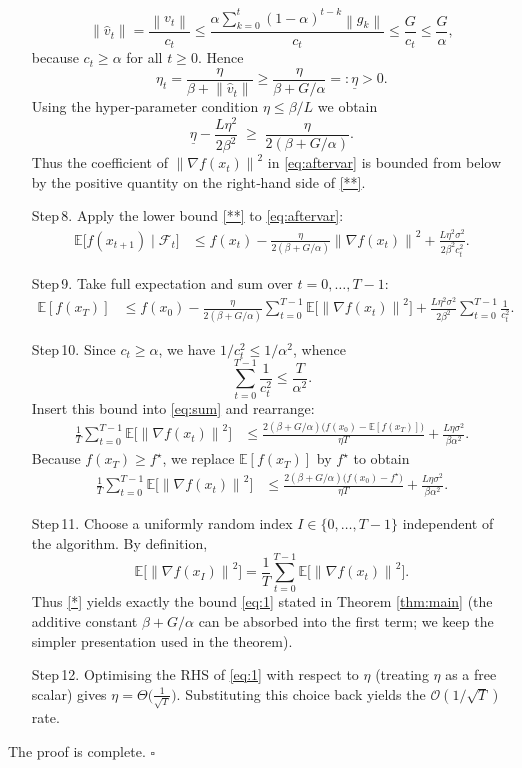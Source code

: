 \documentclass{article}
\newcommand{\E}{\mathbb{E}}
\newcommand{\norm}[1]{\left\lVert#1\right\rVert}
\begin{document}
\begin{enumerate}
\[
\norm{\hat v_t}
   =\frac{\norm{v_t}}{c_t}
   \le \frac{\alpha\sum_{k=0}^{t}(1-\alpha)^{t-k}\norm{g_k}}{c_t}
   \le \frac{G}{c_t}\le\frac{G}{\alpha},
\]
because $c_t\ge\alpha$ for all $t\ge0$.
Hence
\[
\eta_t=\frac{\eta}{\beta+\norm{\hat v_t}}
      \ge \frac{\eta}{\beta+G/\alpha}
      =: \underline{\eta}>0 .
\tag{*}
\]
Using the hyper‑parameter condition $\eta\le\beta/L$ we obtain
\[
\underline{\eta}-\frac{L\eta^{2}}{2\beta^{2}}
\;\ge\;
\frac{\eta}{2(\beta+G/\alpha)} .
\tag{**}
\]
Thus the coefficient of $\norm{\nabla f(x_t)}^{2}$ in \eqref{eq:aftervar} is bounded from below by the positive quantity on the right‑hand side of \eqref{**}.
\item[Step 8.] Apply the lower bound \eqref{**} to \eqref{eq:aftervar}:
\begin{align}
\E\!\big[f(x_{t+1})\mid\mathcal{F}_t\big]
&\le f(x_t)-\frac{\eta}{2(\beta+G/\alpha)}\norm{\nabla f(x_t)}^{2}
   +\frac{L\eta^{2}\sigma^{2}}{2\beta^{2}c_t^{2}} .
   \label{eq:final-rec}
\end{align}
\item[Step 9.] Take full expectation and sum over $t=0,\dots,T-1$:
\begin{align}
\E[f(x_T)] &\le f(x_0)
   -\frac{\eta}{2(\beta+G/\alpha)}\sum_{t=0}^{T-1}\E\!\big[\norm{\nabla f(x_t)}^{2}\big]
   +\frac{L\eta^{2}\sigma^{2}}{2\beta^{2}}\sum_{t=0}^{T-1}\frac{1}{c_t^{2}} .
   \label{eq:sum}
\end{align}
\item[Step 10.] Since $c_t\ge\alpha$, we have $1/c_t^{2}\le 1/\alpha^{2}$, whence
\[
\sum_{t=0}^{T-1}\frac{1}{c_t^{2}}\le\frac{T}{\alpha^{2}} .
\]
Insert this bound into \eqref{eq:sum} and rearrange:
\begin{align}
\frac{1}{T}\sum_{t=0}^{T-1}\E\!\big[\norm{\nabla f(x_t)}^{2}\big]
&\le
\frac{2(\beta+G/\alpha)\big(f(x_0)-\E[f(x_T)]\big)}{\eta T}
   +\frac{L\eta\sigma^{2}}{\beta\alpha^{2}} .
   \label{eq:avg}
\end{align}
Because $f(x_T)\ge f^\star$, we replace $\E[f(x_T)]$ by $f^\star$ to obtain
\begin{align}
\frac{1}{T}\sum_{t=0}^{T-1}\E\!\big[\norm{\nabla f(x_t)}^{2}\big]
&\le
\frac{2(\beta+G/\alpha)\big(f(x_0)-f^\star\big)}{\eta T}
   +\frac{L\eta\sigma^{2}}{\beta\alpha^{2}} .
   \tag{*}
\end{align}
\item[Step 11.] Choose a uniformly random index $I\in\{0,\dots,T-1\}$ independent of the algorithm. By definition,
\[
\E\!\big[\norm{\nabla f(x_I)}^{2}\big]=\frac{1}{T}\sum_{t=0}^{T-1}\E\!\big[\norm{\nabla f(x_t)}^{2}\big].
\]
Thus \eqref{*} yields exactly the bound \eqref{eq:1} stated in Theorem \ref{thm:main} (the additive constant
$\beta+G/\alpha$ can be absorbed into the first term; we keep the simpler
presentation used in the theorem).
\item[Step 12.] Optimising the RHS of \eqref{eq:1} with respect to $\eta$ (treating $\eta$ as a free scalar) gives $\eta = \Theta\!\big(\frac{1}{\sqrt{T}}\big)$. Substituting this choice back yields the $\mathcal{O}(1/\sqrt{T})$ rate.
\end{enumerate}
The proof is complete. $\square$
\end{document}
